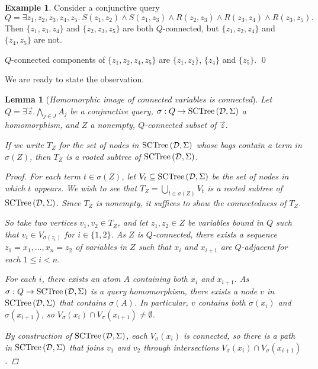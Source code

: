 \documentclass[12pt]{report}
\theoremstyle{plain}
\newtheorem{lemma}[theorem]{Lemma}
\theoremstyle{definition}
\newtheorem{example}[theorem]{Example}
\newcommand{\SCTree}[2]{\ensuremath{\normalfont{\textrm{SCTree}} \left( #1, #2 \right)}}
\begin{document}
\begin{example}
  Consider a conjunctive query $$Q = \exists z_1,z_2,z_3,z_4,z_5.\ S(z_1, z_2) \wedge S(z_1,z_3) \wedge R(z_2,z_3) \wedge R(z_3, z_4) \wedge R(z_3, z_5).$$
  Then $\{z_1, z_3, z_4\}$ and $\{z_2, z_3, z_5\}$ are both $Q$-connected, but $\{z_1, z_2, z_4\}$ and $\{z_4, z_5\}$ are not.

  $Q$-connected components of $\{z_1, z_2, z_4, z_5\}$ are $\{z_1,z_2\}$, $\{z_4\}$ and $\{z_5\}$.
  \qed
\end{example}

We are ready to state the observation.

\begin{lemma}[\emph{Homomorphic image of connected variables is connected}]
\label{image-of-connected-variables-is-connected}
  Let $Q = \exists \vec{z}. \bigwedge_{j \in J} A_j$ be a conjunctive query, $\sigma: Q \rightarrow \SCTree{\mathcal{D}}{\Sigma}$ a homomorphism, and $Z$ a nonempty, $Q$-connected subset of $\vec{z}$.

  If we write $T_Z$ for the set of nodes in $\SCTree{\mathcal{D}}{\Sigma}$ whose bags contain a term in $\sigma(Z)$, then $T_Z$ is a rooted subtree of $\SCTree{\mathcal{D}}{\Sigma}$.
  \begin{proof}
    For each term $t \in \sigma(Z)$, let $V_t \subseteq \SCTree{\mathcal{D}}{\Sigma}$ be the set of nodes in which $t$ appears. We wish to see that $T_Z = \bigcup_{t \in \sigma(Z)} V_t$ is a rooted subtree of $\SCTree{\mathcal{D}}{\Sigma}$. Since $T_Z$ is nonempty, it suffices to show the connectedness of $T_Z$.

    So take two vertices $v_1, v_2 \in T_Z$, and let $z_1, z_2 \in Z$ be variables bound in $Q$ such that $v_i \in V_{\sigma(z_i)}$ for $i \in \{1, 2\}$. As $Z$ is $Q$-connected, there exists a sequence $z_1 = x_1, \ldots, x_n = z_2$ of variables in $Z$ such that $x_i$ and $x_{i+1}$ are $Q$-adjacent for each $1 \leq i < n$.

    For each $i$, there exists an atom $A$ containing both $x_i$ and $x_{i+1}$. As \newline $\sigma: Q \rightarrow \SCTree{\mathcal{D}}{\Sigma}$ is a query homomorphism, there exists a node $v$ in $\SCTree{\mathcal{D}}{\Sigma}$ that contains $\sigma(A)$. In particular, $v$ contains both $\sigma(x_i)$ and $\sigma(x_{i+1})$, so $V_\sigma(x_i) \cap V_\sigma(x_{i+1}) \neq \emptyset$.

    By construction of $\SCTree{\mathcal{D}}{\Sigma}$, each $V_\sigma(x_i)$ is connected, so there is a path in $\SCTree{\mathcal{D}}{\Sigma}$ that joins $v_1$ and $v_2$ through intersections $V_\sigma(x_i) \cap V_\sigma(x_{i+1})$.
  \end{proof}
\end{lemma}
\end{document}
